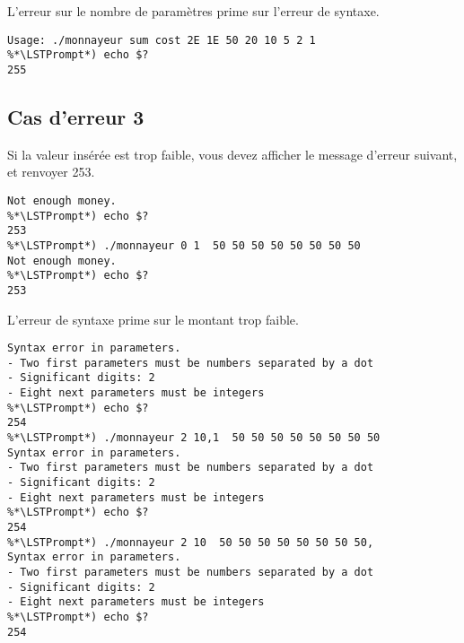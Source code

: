\bigskip

\noindent L'erreur sur le nombre de paramètres prime sur l'erreur de syntaxe.

\bigskip

\begin{lstlisting}[frame=single,title={Cas d'erreur 1 et 2}]
%*\LSTPrompt*) ./monnayeur 42,1
Usage: ./monnayeur sum cost 2E 1E 50 20 10 5 2 1
%*\LSTPrompt*) echo $?
255
\end{lstlisting}




\newpage

\subsection{Cas d'erreur 3}

\bigskip

\noindent Si la valeur insérée est trop faible, vous devez afficher le message d'erreur suivant, et renvoyer 253.

\bigskip

\noindent {}

\bigskip

\begin{lstlisting}[frame=single,title={Cas d'erreur 3 (C et Python)}]
%*\LSTPrompt*) ./monnayeur 2 10  50 50 50 50 50 50 50 50
Not enough money.
%*\LSTPrompt*) echo $?
253
%*\LSTPrompt*) ./monnayeur 0 1  50 50 50 50 50 50 50 50
Not enough money.
%*\LSTPrompt*) echo $?
253
\end{lstlisting}

\bigskip

\noindent L'erreur de syntaxe prime sur le montant trop faible.

\bigskip

\begin{lstlisting}[frame=single,title={Cas d'erreur 2 et 3 (C et Python)}]
%*\LSTPrompt*) ./monnayeur 2,10 10  50 50 50 50 50 50 50 50
Syntax error in parameters.
- Two first parameters must be numbers separated by a dot
- Significant digits: 2
- Eight next parameters must be integers
%*\LSTPrompt*) echo $?
254
%*\LSTPrompt*) ./monnayeur 2 10,1  50 50 50 50 50 50 50 50
Syntax error in parameters.
- Two first parameters must be numbers separated by a dot
- Significant digits: 2
- Eight next parameters must be integers
%*\LSTPrompt*) echo $?
254
%*\LSTPrompt*) ./monnayeur 2 10  50 50 50 50 50 50 50 50,
Syntax error in parameters.
- Two first parameters must be numbers separated by a dot
- Significant digits: 2
- Eight next parameters must be integers
%*\LSTPrompt*) echo $?
254
\end{lstlisting}


